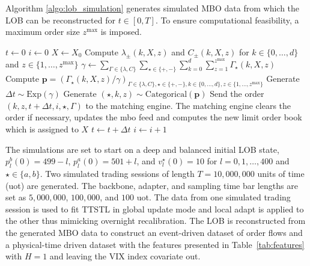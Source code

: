\documentclass[10pt,a4paper,oneside]{article}
\begin{document}
Algorithm \ref{algo:lob_simulation} generates simulated MBO data from which the LOB can be reconstructed for $t \in [0,T]$. To ensure computational feasibility, a maximum order size $z^{\max}$ is imposed.


\begin{algorithm}[H]
    \caption{Limit Order Book Simulation Algorithm}
    \label{algo:lob_simulation}
    \begin{algorithmic}
        \State $t \gets 0$
        \State $i \gets 0$
        \State $X \gets X_0$
        \State Compute $\lambda_{\pm}(k, X, z)$ and $C_{\pm}(k, X, z)$ for $k \in \{0 , \dots, d \}$ and $z \in \{ 1, \dots, z^{\max} \}$
        \State $\gamma \gets \sum_{\Gamma \in \{ \lambda, C \}} \sum_{\star \in \{+, - \}} \sum^{d}_{k = 0} \sum^{z^{\max}}_{z = 1} \Gamma_{\star}(k, X, z)$
        \State Compute $\mathbf{p} = \left(\Gamma_{\star}(k, X, z) / \gamma\right)_{\Gamma \in \{ \lambda, C \}, \star \in \{+, -\}, k \in \{ 0, \dots, d \}, z \in \{1, \dots, z^{\max} \} }$
        \State Generate $\Delta t \sim \text{Exp}(\gamma)$
        \State Generate $(\star, k, z) \sim \text{Categorical}(\mathbf{p})$
        \State Send the order $(k, z, t + \Delta t, i, \star, \Gamma)$ to the matching engine.
        \State The matching engine clears the order if necessary, updates the mbo feed and computes the new limit order book which is assigned to $X$
        \State $t \gets t + \Delta t$
        \State $i \gets i + 1$
        \EndWhile
    \end{algorithmic}
\end{algorithm}

The simulations are set to start on a deep and balanced initial LOB state, $p^b_l(0) = 499 - l$, $p^a_l(0) = 501 + l$, and $v^\star_l(0) = 10$ for $l = 0, 1, \dots, 400$ and $\star \in \{a, b\}$. Two simulated trading sessions of length $T = 10{,}000{,}000$ units of time (uot) are generated. The backbone, adapter, and sampling time bar lengths are set as $5{,}000{,}000$, $100{,}000$, and $100$ uot. The data from one simulated trading session is used to fit TTSTL in global update mode and local adapt is applied to the other thus mimicking overnight recalibration. The LOB is reconstructed from the generated MBO data to construct an event-driven dataset of order flows and a physical-time driven dataset with the features presented in Table~\ref{tab:features} with $H = 1$ and leaving the VIX index covariate out.
\end{document}
